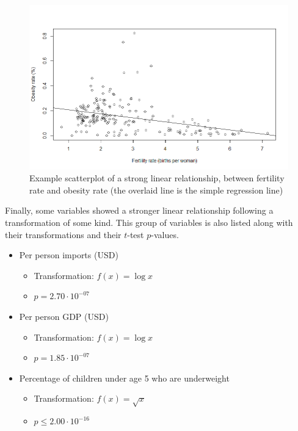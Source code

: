 \documentclass[oneside,12pt]{report}
\begin{document}
\begin{figure}
\centering
\label{fig:fertility-obesity-scatter}
\includegraphics[width=\textwidth]{fertility-obesity-scatter.png}
\caption[Scatterplot of a strong linear relationship]{Example scatterplot of a strong linear relationship, between fertility rate and obesity rate (the overlaid line is the simple regression line)}
\end{figure}

Finally, some variables showed a stronger linear relationship following a transformation of some kind. This group of variables is also listed along with their transformations and their $t$-test $p$-values.

\begin{itemize}
\item Per person imports (USD)
	\begin{itemize}
	\item Transformation: \begin{math}f(x) =\log{x}\end{math}
	\item \begin{math}p=2.70\cdot10^{-07}\end{math}
	\end{itemize}
\item Per person GDP (USD)
	\begin{itemize}
	\item Transformation: \begin{math}f(x) = \log{x}\end{math}
	\item \begin{math}p=1.85\cdot10^{-07}\end{math}
	\end{itemize}
\item Percentage of children under age 5 who are underweight
	\begin{itemize}
	\item Transformation: \begin{math}f(x) = \sqrt{x}\end{math}
	\item \begin{math}p\leq2.00\cdot10^{-16}\end{math}
	\end{itemize}
\end{itemize}
\end{document}
